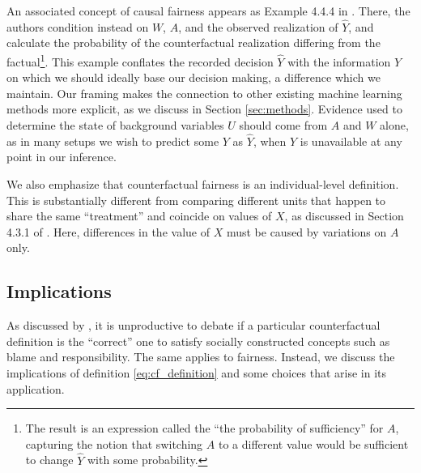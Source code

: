An associated concept of causal fairness appears as Example 4.4.4 in
\citet{pearl:16}. There, the authors condition instead on $W$, $A$,
and the observed realization of $\hat Y$, and calculate the
probability of the counterfactual realization differing from the
factual\footnote{The result is an expression called the ``the
  probability of sufficiency'' for $A$, capturing the notion that
  switching $A$ to a different value would be sufficient to change
  $\hat Y$ with some probability.}. This example conflates the
recorded decision $\hat Y$ with the information $Y$ on which we should
ideally base our decision making, a difference which we maintain.  Our
framing makes the connection to other existing machine learning
methods more explicit, as we discuss in Section \ref{sec:methods}.
Evidence used to determine the state of background variables $U$
should come from $A$ and $W$ alone, as in many setups we wish to
predict some $Y$ as $\hat Y$, when $Y$ is unavailable at any point in
our inference.

We also emphasize that counterfactual fairness is an
individual-level definition. This is substantially different
from comparing different units that happen to share the
same ``treatment'' and coincide on values of $X$, as discussed in
Section 4.3.1 of \citep{pearl:16}. Here, differences in the value
of $X$ must be caused by variations on $A$ only.

\subsection{Implications}
%
As discussed by \citet{halpern:16}, it is unproductive to debate
if a particular counterfactual definition is the ``correct'' one
to satisfy socially constructed concepts such as blame and responsibility.
The same applies to fairness. Instead, we discuss the
implications of definition \eqref{eq:cf_definition} and some choices
that arise in its application.

